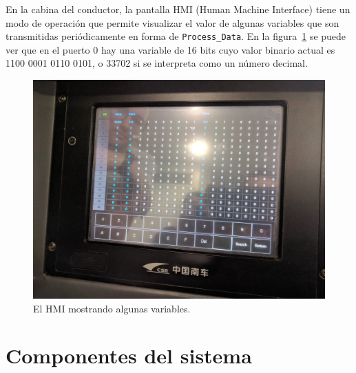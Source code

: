 En la cabina del conductor, la pantalla HMI (Human Machine Interface) tiene un modo de operación que permite visualizar el valor de algunas variables que son transmitidas periódicamente en forma de \texttt{Process\_Data}. En la figura~\ref{fig:hmi} se puede ver que en el puerto 0 hay una variable de 16 bits cuyo valor binario actual es 1100 0001 0110 0101, o 33702 si se interpreta como un número decimal.

\begin{figure}[htbp]
	\centering
	\includegraphics[width=1\textwidth]{./Figures/hmi.jpg}
	\caption[El HMI mostrando algunas variables]{El HMI mostrando algunas variables.}
    \label{fig:hmi}
\end{figure}



\section{Componentes del sistema}
